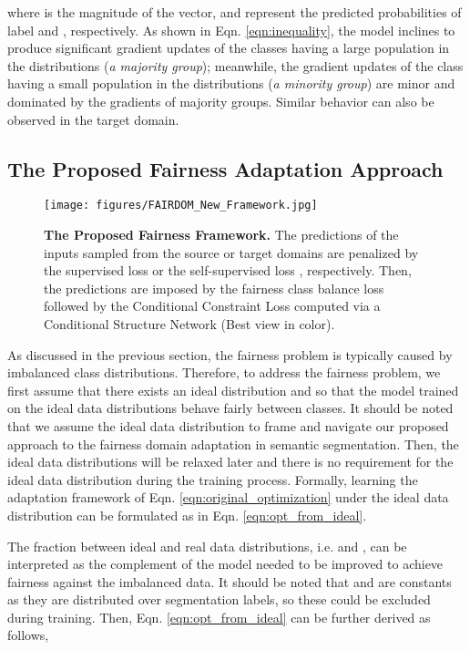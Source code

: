 \documentclass[10pt,twocolumn,letterpaper]{article}
\begin{document}
where  is the magnitude of the vector,
 and  represent the predicted probabilities of label  and , respectively.
As shown in Eqn. \eqref{eqn:inequality}, 
the model inclines to produce significant gradient updates of the classes having a large population in the distributions (\textit{a majority group}); meanwhile, the gradient updates of the class having a small population in the distributions (\textit{a minority group}) are minor and dominated by the gradients of majority groups. 
Similar behavior can also be observed in the target domain.

\subsection{The Proposed Fairness Adaptation Approach}

\begin{figure*}
    \centering
    \texttt{[image: figures/FAIRDOM\_New\_Framework.jpg]}
    \vspace{-3mm}
    \caption{\textbf{The Proposed Fairness Framework.}
    The predictions of the inputs sampled from the source or target domains are penalized by the supervised loss  or the self-supervised loss , respectively. Then, the predictions are imposed by the fairness class balance loss  followed by the Conditional Constraint Loss  computed via a Conditional Structure Network (Best view in color).
    }
    \vspace{-6mm}
    \label{fig:fair_da_framework}
\end{figure*}

As discussed in the previous section, the fairness problem 
is typically caused by imbalanced class distributions. 
Therefore, to address the fairness problem, we first assume that there exists an ideal distribution  and  so that the model trained on the ideal data distributions behave fairly between classes. 
It should be noted that we assume the ideal data distribution to frame and navigate our proposed approach to the fairness domain adaptation in semantic segmentation.
Then, the ideal data distributions will be relaxed later and there is no requirement for the ideal data distribution during the training process.
Formally, learning the adaptation framework of Eqn. \eqref{eqn:original_optimization} under the ideal data distribution can be formulated as in Eqn. \eqref{eqn:opt_from_ideal}.

The fraction between ideal and real data distributions, i.e.  and , can be interpreted as the complement of the model needed to be improved to achieve fairness against the imbalanced data.
It should be noted that  and  are constants as they are distributed over segmentation labels, 
so these could be excluded during training. Then, Eqn. \eqref{eqn:opt_from_ideal} can be further derived as follows,
\end{document}
